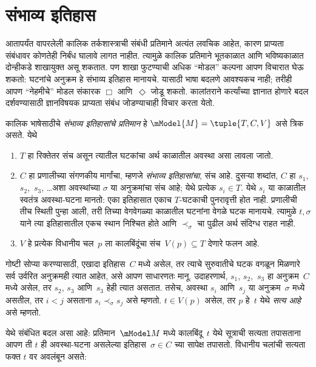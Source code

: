 \section{संभाव्य इतिहास}\label{aml:tl:poss:sec}
आतापर्यंत वापरलेली कालिक तर्कशास्त्राची संबंधी
प्रतिमाने अत्यंत लवचिक आहेत, कारण प्राप्यता संबंधावर
कोणतेही निर्बंध घालावे लागत नाहीत. त्यामुळे कालिक
प्रतिमाने भूतकाळात आणि भविष्यकाळात दोन्हीकडे
शाखायुक्त असू शकतात. पण शाखा फुटण्याची अधिक
``मोडल'' कल्पना आपण विचारात घेऊ शकतो: घटनांचे
अनुक्रम हे संभाव्य इतिहास मानायचे. यासाठी भाषा
बदलणे आवश्यकच नाही; तरीही आपण ``नेहमीचे''
मोडल संकारक $\Box$ आणि~$\Diamond$ जोडू शकतो.
कालांतराने कर्त्यांच्या ज्ञानात होणारे बदल दर्शवण्यासाठी
ज्ञानविषयक प्राप्यता संबंध जोडण्याचाही विचार करता येतो.
\begin{defn}
  कालिक भाषेसाठीचे \emph{संभाव्य इतिहासांचे प्रतिमान}
  हे $\mModel{M} = \tuple{T, C, V}$ असे त्रिक असते. येथे
  \begin{enumerate}
    \item $T$ हा रिक्तेतर संच असून त्यातील घटकांचा अर्थ
      काळातील अवस्था असा लावला जातो.
    \item $C$ हा प्रणालीच्या संगणकीय मार्गांचा, म्हणजे
      \emph{संभाव्य इतिहासांचा}, संच आहे. दुसऱ्या शब्दांत,
      $C$ हा $s_1$, $s_2$,~$s_3$, \dots अशा अवस्थांच्या
      $\sigma$ या अनुक्रमांचा संच आहे; येथे
      प्रत्येक $s_i \in T$. येथे $s_i$ या काळातील स्वतंत्र
      अवस्था-घटना मानतो: एका इतिहासात एकाच $T$-घटकाची
      पुनरावृत्ती होत नाही. प्रणालीची तीच स्थिती पुन्हा आली,
      तरी तिच्या वेगवेगळ्या काळातील घटनांना वेगळे घटक मानायचे.
      त्यामुळे $t,\sigma$ याने त्या इतिहासातील एकच स्थान
      निश्चित होते आणि $\prec_\sigma$ चा पुढील अर्थ संदिग्ध राहत नाही.
    \item $V$ हे प्रत्येक विधानीय चल~$p$ ला कालबिंदूंचा संच~$V(p) \subseteq T$ देणारे फलन आहे.
  \end{enumerate}
  गोष्टी सोप्या करण्यासाठी, एखादा इतिहास~$C$ मध्ये
  असेल, तर त्याचे सुरुवातीचे घटक वगळून मिळणारे
  सर्व उर्वरित अनुक्रमही त्यात आहेत, असे आपण साधारणतः
  मानू. उदाहरणार्थ, $s_1$, $s_2$,~$s_3$ हा अनुक्रम~$C$
  मध्ये असेल, तर $s_2$, $s_3$ आणि~$s_3$ हेही त्यात
  असतात. तसेच, अवस्था $s_i$ आणि~$s_j$ या
  अनुक्रम~$\sigma$ मध्ये असतील, तर $i < j$ असताना
  $s_i \prec_\sigma s_j$ असे म्हणतो.
  $t \in V(p)$ असेल, तर $p$ हे~$t$ येथे
  \emph{सत्य आहे} असे म्हणतो.
\end{defn}
येथे संबंधित बदल असा आहे: प्रतिमान~$\mModel M$
मध्ये कालबिंदू~$t$ येथे सूत्राची सत्यता
तपासताना आपण ती $t$ ही अवस्था-घटना असलेल्या
इतिहास~$\sigma \in C$ च्या सापेक्ष तपासतो.
विधानीय चलांची सत्यता फक्त $t$ वर अवलंबून असते:
